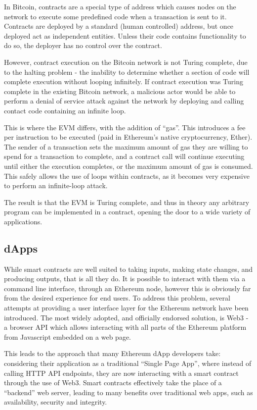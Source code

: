 In Bitcoin, contracts are a special type of address which causes nodes on the network to execute some predefined code when a transaction is sent to it. Contracts are deployed by a standard (human controlled) address, but once deployed act as independent entities. Unless their code contains functionality to do so, the deployer has no control over the contract.

However, contract execution on the Bitcoin network is not Turing complete, due to the halting problem - the inability to determine whether a section of code will complete execution without looping infinitely. If contract execution was Turing complete in the existing Bitcoin network, a malicious actor would be able to perform a denial of service attack against the network by deploying and calling contact code containing an infinite loop.

This is where the EVM differs, with the addition of “gas”. This introduces a fee per instruction to be executed (paid in Ethereum’s native cryptocurrency, Ether). The sender of a transaction sets the maximum amount of gas they are willing to spend for a transaction to complete, and a contract call will continue executing until either the execution completes, or the maximum amount of gas is consumed. This safely allows the use of loops within contracts, as it becomes very expensive to perform an infinite-loop attack.

The result is that the EVM is Turing complete, and thus in theory any arbitrary program can be implemented in a contract, opening the door to a wide variety of applications.

\subsection{dApps}

While smart contracts are well suited to taking inputs, making state changes, and producing outputs, that is all they do. It is possible to interact with them via a command line interface, through an Ethereum node, however this is obviously far from the desired experience for end users. To address this problem, several attempts at providing a user interface layer for the Ethereum network have been introduced. The most widely adopted, and officially endorsed solution, is Web3 - a browser API which allows interacting with all parts of the Ethereum platform from Javascript embedded on a web page.

This leads to the approach that many Ethereum dApp developers take: considering their application as a traditional “Single Page App”, where instead of calling HTTP API endpoints, they are now interacting with a smart contract through the use of Web3. Smart contracts effectively take the place of a “backend” web server, leading to many benefits over traditional web apps, such as availability, security and integrity.

